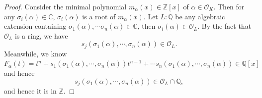 \documentclass[11pt]{book}
\begin{document}
\begin{proof}
    Consider the minimal polynomial $m_{\alpha}(x)\in \mathbb{Z}[x]$ of $\alpha \in \mathcal{O}_K$. Then for any $\sigma_i(\alpha) \in \mathbb{C}$, $\sigma_i(\alpha)$ is a root of $m_\alpha(x)$. Let $L:\mathbb{Q}$ be any algebraic extension containing $\sigma_1(\alpha),\cdots\sigma_n(\alpha) \in \mathbb{C}$, then $\sigma_i(\alpha)\in \mathcal{O}_L$. By the fact that $\mathcal{O}_L$ is a ring, we have $$s_j(\sigma_1(\alpha),\cdots ,\sigma_n(\alpha))\in \mathcal{O}_L.$$ 
    Meanwhile, we know $F_{\alpha}(t)=t^n+s_1(\sigma_1(\alpha),\cdots ,\sigma_n(\alpha))t^{n-1}+\cdots s_n(\sigma_1(\alpha),\cdots ,\sigma_n(\alpha)) \in \mathbb{Q}[x]$ and hence $$s_j(\sigma_1(\alpha),\cdots,\sigma_n(\alpha))\in \mathcal{O}_L \cap \mathbb{Q},$$ 
    and hence it is in $\mathbb{Z}$.
\end{proof}
\end{document}
